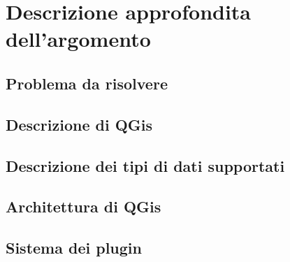 
\chapter{Descrizione approfondita dell'argomento}
\label{cap:descrizione}
\section{Problema da risolvere}
\lipsum[1]

\section{Descrizione di QGis}
\lipsum[2]

\section{Descrizione dei tipi di dati supportati}
\lipsum[3]

\section{Architettura di QGis}
\lipsum[4]

\section{Sistema dei plugin}
\lipsum[5]
